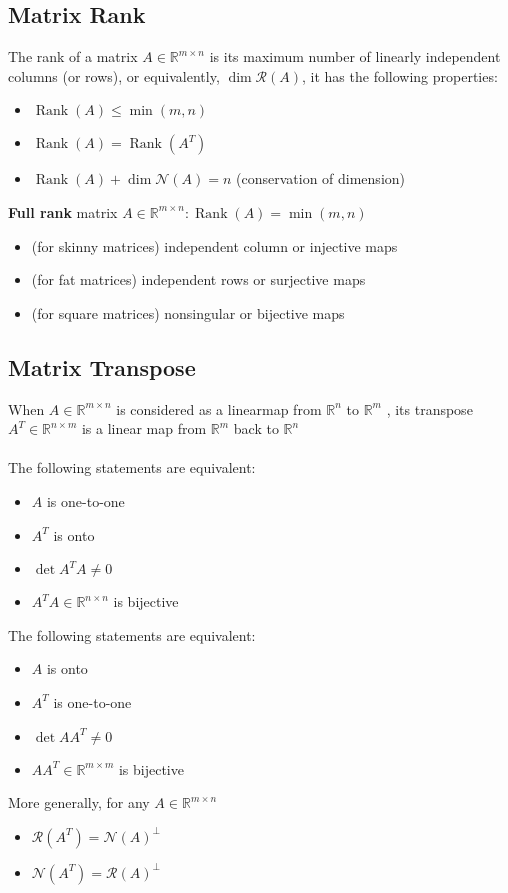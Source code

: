 \documentclass[10pt,a4paper,oneside]{article}
\begin{document}
\subsection{Matrix Rank}
The rank of a matrix $A \in \mathbb{R}^{m \times n}$ is its maximum number of linearly independent  columns (or rows), or equivalently, $\operatorname{dim} \mathcal{R}(A)$, it has the following properties:
\begin{itemize}
\item $\operatorname{Rank}(A) \leq \min (m, n)$
\item $\operatorname{Rank}(A)=\operatorname{Rank}\left(A^{T}\right)$
\item $\operatorname{Rank}(A)+\operatorname{dim} \mathcal{N}(A)=n$ (conservation of dimension)
\end{itemize}
{\bfseries Full rank} matrix $A \in \mathbb{R}^{m \times n}: \operatorname{Rank}(A)=\min (m, n)$
\begin{itemize}
\item (for skinny matrices) independent column or injective maps
\item (for fat matrices) independent rows or surjective maps
\item (for square matrices) nonsingular or bijective maps
\end{itemize}

\subsection{Matrix Transpose}
When $A \in \mathbb{R}^{m \times n}$ is considered as a linearmap from $\mathbb{R}^{n}$ to $\mathbb{R}^{m}$ , its
transpose $A^{T} \in \mathbb{R}^{n \times m}$ is a linear map from $\mathbb{R}^{m}$ back to $\mathbb{R}^{n}$\\
\\The following statements are equivalent:
\begin{itemize}
\item $A$ is one-to-one
\item $A^{T}$ is onto
\item $\operatorname{det} A^{T} A \neq 0$
\item $A^{T} A \in \mathbb{R}^{n \times n}$ is bijective
\end{itemize}
The following statements are equivalent:
\begin{itemize}
\item $A$ is onto
\item $A^{T}$ is one-to-one
\item $\operatorname{det} A A^{T} \neq 0$
\item $A A^{T} \in \mathbb{R}^{m \times m}$ is bijective
\end{itemize}
More generally, for any $A\in \mathbb{R}^{m\times n}$
\begin{itemize}
\item $\mathcal{R}\left(A^{T}\right)=\mathcal{N}(A)^{\perp}$
\item $\mathcal{N}\left(A^{T}\right)=\mathcal{R}(A)^{\perp}$
\end{itemize}
\end{document}

